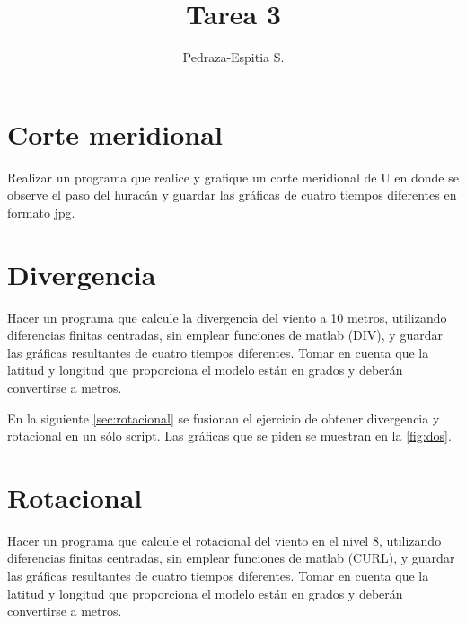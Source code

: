 \documentclass{article}
\title{Tarea 3}
\author{Pedraza-Espitia S.}
\date{}
\begin{document}
\maketitle

\section{Corte meridional}
Realizar un programa que realice y grafique un corte meridional de U en donde se observe el
paso del huracán y guardar las gráficas de cuatro tiempos diferentes en formato jpg.





\section{Divergencia}
Hacer un programa que calcule la divergencia del viento a 10 metros, utilizando diferencias
finitas centradas, sin emplear funciones de matlab (DIV), y guardar las gráficas resultantes de
cuatro tiempos diferentes. Tomar en cuenta que la latitud y longitud que proporciona el
modelo están en grados y deberán convertirse a metros.

En la siguiente \autoref{sec:rotacional} se fusionan el ejercicio de obtener divergencia y rotacional en un s\'olo script. Las gr\'aficas que se piden se muestran en la \autoref{fig:dos}.


\section{Rotacional}\label{sec:rotacional}
Hacer un programa que calcule el rotacional del viento en el nivel 8, utilizando diferencias
finitas centradas, sin emplear funciones de matlab (CURL), y guardar las gráficas resultantes
de cuatro tiempos diferentes. Tomar en cuenta que la latitud y longitud que proporciona el
modelo están en grados y deberán convertirse a metros.


\FloatBarrier
\end{document}
